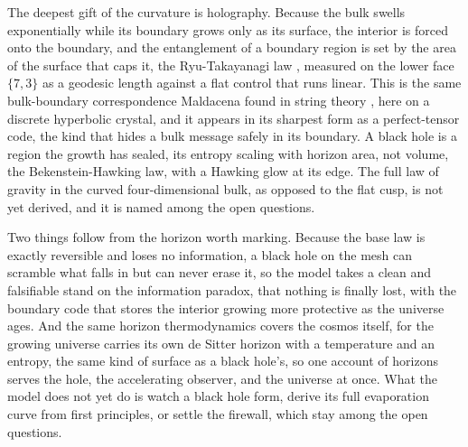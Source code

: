 The deepest gift of the curvature is holography. Because the bulk swells exponentially while its boundary grows only as its surface, the interior is forced onto the boundary, and the entanglement of a boundary region is set by the area of the surface that caps it, the Ryu-Takayanagi law \cite{ryu2006}, measured on the lower face $\{7,3\}$ as a geodesic length against a flat control that runs linear. This is the same bulk-boundary correspondence Maldacena found in string theory \cite{maldacena1998}, here on a discrete hyperbolic crystal, and it appears in its sharpest form as a perfect-tensor code, the kind that hides a bulk message safely in its boundary. A black hole is a region the growth has sealed, its entropy scaling with horizon area, not volume, the Bekenstein-Hawking law, with a Hawking glow at its edge. The full law of gravity in the curved four-dimensional bulk, as opposed to the flat cusp, is not yet derived, and it is named among the open questions.

Two things follow from the horizon worth marking. Because the base law is exactly reversible and loses no information, a black hole on the mesh can scramble what falls in but can never erase it, so the model takes a clean and falsifiable stand on the information paradox, that nothing is finally lost, with the boundary code that stores the interior growing more protective as the universe ages. And the same horizon thermodynamics covers the cosmos itself, for the growing universe carries its own de Sitter horizon with a temperature and an entropy, the same kind of surface as a black hole's, so one account of horizons serves the hole, the accelerating observer, and the universe at once. What the model does not yet do is watch a black hole form, derive its full evaporation curve from first principles, or settle the firewall, which stay among the open questions.
